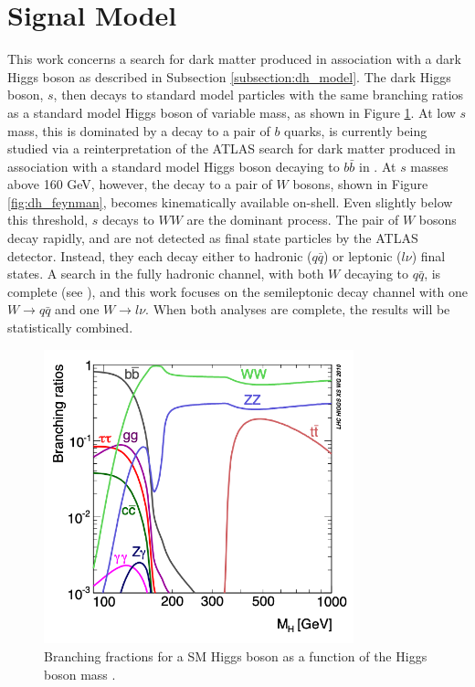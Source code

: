 \label{chapter:ana_prep}

\section{Signal Model}
This work concerns a search for dark matter produced in association with a dark Higgs boson as described in Subsection \ref{subsection:dh_model}.  The dark Higgs boson, $s$, then decays to standard model particles with the same branching ratios as a standard model Higgs boson of variable mass, as shown in Figure \ref{fig:HiggsBR}. At low $s$ mass, this is dominated by a decay to a pair of $b$ quarks, is currently being studied via a reinterpretation of the ATLAS search for dark matter produced in association with a standard model Higgs boson decaying to $b\bar{b}$ in \cite{monos_bb}. At $s$ masses above 160 GeV, however, the decay to a pair of $W$ bosons, shown in Figure \ref{fig:dh_feynman}, becomes kinematically available on-shell. Even slightly below this threshold, $s$ decays to $WW$ are the dominant process. The pair of $W$ bosons decay rapidly, and are not detected as final state particles by the ATLAS detector. Instead, they each decay either to hadronic ($q\bar{q}$) or leptonic ($l\nu$) final states. A search in the fully hadronic channel, with both $W$ decaying to $q\bar{q}$, is complete (see \cite{had_analy}), and this work focuses on the semileptonic decay channel with one $ W \rightarrow q\bar{q} $ and one $ W \rightarrow l\nu $. When both analyses are complete, the results will be statistically combined.

\begin{figure}[H]
    \centering
    \includegraphics[width=0.8\textwidth]{Figures/3/HiggsBR.png}
    \caption{Branching fractions for a SM Higgs boson as a function of the Higgs boson mass \cite{Higgs_BR}.}
    \label{fig:HiggsBR}
\end{figure}

